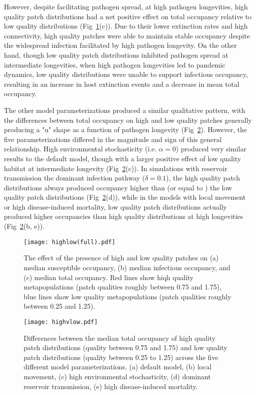 \documentclass{svjour3}
\begin{document}
However, despite facilitating pathogen spread, at high pathogen longevities, high quality patch distributions had a net positive effect on total occupancy relative to low quality distributions (Fig~\ref{sens}(c)).  Due to their lower extinction rates and high connectivity, high quality patches were able to maintain stable occupancy despite the widespread infection facilitated by high pathogen longevity.  On the other hand, though low quality patch distributions inhibited pathogen spread at intermediate longevities, when high pathogen longevities led to pandemic dynamics, low quality distributions were unable to support infectious occupancy, resulting in an increase in host extinction events and a decrease in mean total occupancy.  

The other model parameterizations produced a similar qualitative pattern, with the differences between total occupancy on high and low quality patches generally producing a "u" shape as a function of pathogen longevity (Fig~\ref{highvlow}).  However, the five parameterizations differed in the magnitude and sign of this general relationship.  High environmental stochasticity (i.e. $\alpha = 0$) produced very similar results to the default model, though with a larger positive effect of low quality habitat at intermediate longevity (Fig~\ref{highvlow}(c)).  In simulations with reservoir transmission the dominant infection pathway ($\delta = 0.1$), the high quality patch distributions always produced occupancy higher than (or equal to ) the low quality patch distributions (Fig~\ref{highvlow}(d)), while in the models with local movement or high disease-induced mortality, low quality patch distributions actually produced higher occupancies than high quality distributions at high longevities (Fig~\ref{highvlow}(b, e)).

\begin{figure}
\centering
\texttt{[image: highlow(full).pdf]}
\caption{The effect of the presence of high and low quality patches on (a) median susceptible occupancy, (b) median infectious occupancy, and (c) median total occupancy.  Red lines show hiqh quality metapopulations (patch qualities roughly between 0.75 and 1.75), blue lines show low quality metapopulations (patch qualities roughly between 0.25 and 1.25).}
\label{sens}
\end{figure}

\begin{figure}
\centering
\texttt{[image: highvlow.pdf]}
\caption{Differences between the median total occupancy of high quality patch distributions (quality between 0.75 and 1.75) and low quality patch distributions (quality between 0.25 to 1.25) across the five different model parameterizations. (a) default model, (b) local movement, (c) high environmental stochasticity, (d) dominant reservoir transmission, (e) high disease-induced mortality.}
\label{highvlow}
\end{figure}
\end{document}
